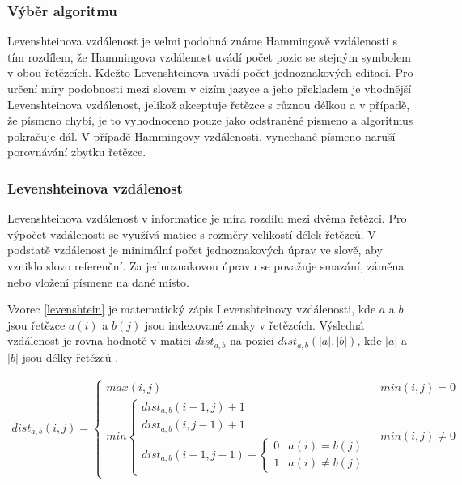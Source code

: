 \documentclass[a4paper,11pt,titlepage,fleqn]{article}
\begin{document}
        \subsubsection{Výběr algoritmu}       
            Levenshteinova vzdálenost je velmi podobná známe Hammingově vzdálenosti s tím rozdílem, že Hammingova vzdálenost uvádí počet pozic se stejným symbolem v obou řetězcích. Kdežto Levenshteinova uvádí počet jednoznakových editací. Pro určení míry podobnosti mezi slovem v cizím jazyce a jeho překladem je vhodnější Levenshteinova vzdálenost, jelikož akceptuje řetězce s různou délkou a v případě, že písmeno chybí, je to vyhodnoceno pouze jako odstraněné písmeno a algoritmus pokračuje dál. V případě Hammingovy vzdálenosti, vynechané písmeno naruší porovnávání zbytku řetězce.

        \subsubsection{Levenshteinova vzdálenost}
            \label{levenstein}
            Levenshteinova vzdálenost v informatice je míra rozdílu mezi dvěma řetězci. Pro výpočet vzdálenosti se využívá matice s rozměry velikostí délek řetězců. V podstatě vzdálenost je minimální počet jednoznakových úprav ve slově, aby vzniklo slovo referenční. Za jednoznakovou úpravu se považuje smazání, záměna nebo vložení písmene na dané místo.

            Vzorec \ref{levenshtein} je matematický zápis Levenshteinovy vzdálenosti, kde $a$ a $b$ jsou řetězce $a(i)$ a $b(j)$ jsou indexované znaky v řetězcích. Výsledná vzdálenost je rovna hodnotě v matici $dist_{a,b}$ na pozici $dist_{a,b}(|a|,|b|)$, kde $|a|$ a $|b|$ jsou délky řetězců \cite{bib:levenshtein}.

            \begin{ceqn}
            \begin{align}
                \label{levenshtein}
                dist_{a,b}(i,j) = 
                \begin{cases} 
                    max(i,j) & min(i,j) = 0\\min
                        \begin{cases}
                            dist_{a,b}(i-1,j)+1\\dist_{a,b}(i,j-1)+1\\dist_{a,b}(i-1,j-1)+
                            \begin{cases}
                                0 & a(i) = b(j)\\1 & a(i) \neq b(j)
                            \end{cases} 
                        \end{cases} & min(i,j) \neq 0 
                \end{cases}
            \end{align}
            \end{ceqn}
\end{document}
